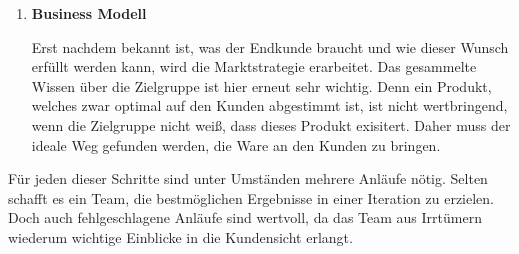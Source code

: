 \begin{enumerate}
	\item \textbf{Business Modell}
	
	Erst nachdem bekannt ist, was der Endkunde braucht und wie dieser Wunsch erfüllt werden kann, wird die Marktstrategie erarbeitet. Das gesammelte Wissen über die Zielgruppe ist hier erneut sehr wichtig. Denn ein Produkt, welches zwar optimal auf den Kunden abgestimmt ist, ist nicht wertbringend, wenn die Zielgruppe nicht weiß, dass dieses Produkt exisitert. Daher muss der ideale Weg gefunden werden, die Ware an den Kunden zu bringen. 
\end{enumerate}

Für jeden dieser Schritte sind unter Umständen mehrere Anläufe nötig. Selten schafft es ein Team, die bestmöglichen Ergebnisse in einer Iteration zu erzielen. Doch auch fehlgeschlagene Anläufe sind wertvoll, da das Team aus Irrtümern wiederum wichtige Einblicke in die Kundensicht erlangt. 
\cite{TheInnovatorsMethod}
\newpage 